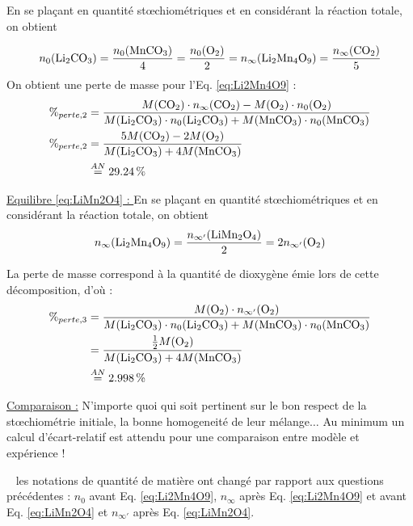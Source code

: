 \documentclass[twoside,a4paper,11pt,addpoints,answers]{exam}%
\begin{document}
\begin{questions}
\begin{mybox}
\begin{solution}[9cm]
En se plaçant en quantité st{\oe}chiométriques et en considérant la réaction totale, on obtient

\begin{align*}
n_0 ( \ce{Li2CO3} ) = \frac{n_0 (\ce{MnCO3} ) }{4} = \frac{n_0 ( \ce{O2} )}{2} = n_\infty( \ce{Li2Mn4O9} ) = \frac{n_\infty ( \ce{CO2} )}{5}
\end{align*}
On obtient une perte de masse pour l'Eq. \ref{eq:Li2Mn4O9} : 
\begin{align*}
\%_{perte, 2} &= \frac{M ( \ce{CO2} ) \cdot n_\infty ( \ce{CO2} ) - M ( \ce{O2} ) \cdot  n_0 ( \ce{O2} )}{M ( \ce{Li2CO3} ) \cdot n_0 ( \ce{Li2CO3} ) + M ( \ce{MnCO3} ) \cdot  n_0 ( \ce{MnCO3} )} \\
\%_{perte, 2} &=  \frac{5 M ( \ce{CO2} ) - 2 M ( \ce{O2} )}{M ( \ce{Li2CO3} ) + 4 M ( \ce{MnCO3} )}\\
&\stackrel{AN}{=} \SI{29.24}{\percent}
\end{align*}

\underline{Equilibre \ref{eq:LiMn2O4} : }
En se plaçant en quantité st{\oe}chiométriques et en considérant la réaction totale, on obtient 
\begin{align*}
n_\infty (\ce{Li2Mn4O9}) = \frac{n_{\infty'} (\ce{LiMn2O4})}{2} = 2 n_{\infty'} (\ce{O2})
\end{align*}

La perte de masse correspond à la quantité de dioxygène émie lors de cette décomposition, d'où : 
\begin{align*}
\%_{perte,3} &= \frac{M ( \ce{O2} ) \cdot n_{\infty'} ( \ce{O2} )}{M ( \ce{Li2CO3} ) \cdot n_0 ( \ce{Li2CO3} ) + M ( \ce{MnCO3} ) \cdot  n_0 ( \ce{MnCO3} )} \\
&= \frac{\frac{1}{2} M ( \ce{O2} )}{M ( \ce{Li2CO3} ) + 4 M ( \ce{MnCO3} )} \\
&\stackrel{AN}{=} \SI{2.998}{\percent} 
\end{align*}

\underline{Comparaison :} N'importe quoi qui soit pertinent sur le bon respect de la st{\oe}chiométrie initiale, la bonne homogeneité de leur mélange$\ldots$ Au minimum un calcul d'écart-relatif est attendu pour une comparaison entre modèle et expérience !

\faWarning ~ les notations de quantité de matière ont changé par rapport aux questions précédentes : $n_0$ avant Eq. \ref{eq:Li2Mn4O9}, $n_\infty$ après Eq. \ref{eq:Li2Mn4O9} et avant Eq. \ref{eq:LiMn2O4} et $n_{\infty'}$ après Eq. \ref{eq:LiMn2O4}.
\end{solution}\end{mybox}



\end{questions}
\end{document}
